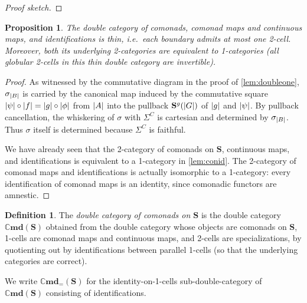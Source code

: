 \documentclass[11pt, oneside, article]{memoir}
\theoremstyle{plain}
\newtheorem{proposition}[theorem]{Proposition}
\theoremstyle{definition}
\newtheorem{definition}[def]{Definition}
\theoremstyle{remark}
\DeclarePairedDelimiter{\abs}{\lvert}{\rvert}
\newcommand{\namedcat}[1]{\mathbf{#1}}
\newcommand{\cat}[1]{\mathbf{#1}}
\newcommand{\Cmd}{\mathbb{C}\namedcat{md}}
\newcommand{\CmdId}{\Cmd_=}
\newcommand{\pts}[1]{{\abs{#1}}}
\newcommand{\qpts}[1]{\pts{#1}}
\newcommand{\one}[1]{\pts{#1}}
\newcommand{\carr}{\Sigma}
\newcommand{\car}[1]{\carr^{#1}}
\newcommand{\carC}{\car{\cC}}
\newcommand{\con}[2]{{#1}^{#2}}
\newcommand{\connat}[1]{\vec{#1}}
\newcommand{\cmnd}[1]{{#1}}
\newcommand{\cA}{\cmnd{A}}
\newcommand{\cB}{\cmnd{B}}
\newcommand{\cC}{\cmnd{C}}
\newcommand{\cD}{\cmnd{D}}
\newcommand{\bS}{\cat{S}}
\begin{document}
\begin{proof}[Proof sketch]
\end{proof}

\begin{proposition}\label{lem:thin}
  The double category of comonads, comonad maps and continuous maps,
  and identifications is thin, i.e.\ each boundary admits at most one
  2-cell. Moreover, both its underlying 2-categories are equivalent to
  1-categories (all globular 2-cells in this thin double category are
  invertible).
\end{proposition}
\begin{proof}
  As witnessed by the commutative diagram in the proof of
  \cref{lem:doubleone}, $\sigma_{\qpts{\cB}}$ is carried by the
  canonical map induced by the commutative square
  $\one{\psi} \circ \one{f} = \one{g} \circ \one{\phi}$ from
  $\qpts{A}$ into the pullback $\con{\bS}{g}(\qpts{G})$ of $\one{g}$
  and $\one{\psi}$. By pullback cancellation, the whiskering of
  $\sigma$ with $\carC$ is cartesian and determined by
  $\sigma_{\qpts{\cB}}$. Thus $\sigma$ itself is determined because
  $\carC$ is faithful.
  
  We have already seen that the 2-category of comonads on $\bS$,
  continuous maps, and identifications is equivalent to a
  1-category in \cref{lem:conid}. The 2-category of comonad maps and
  identifications is actually isomorphic to a 1-category: every
  identification of comonad maps is an identity, since comonadic
  functors are amnestic.
\end{proof}

\begin{definition}
  The \emph{double category of comonads on $\bS$} is the double
  category $\Cmd(\bS)$ obtained from the double category whose objects
  are comonads on $\bS$, 1-cells are comonad maps and continuous maps,
  and 2-cells are specializations, by quotienting out by
  identifications between parallel 1-cells (so that the underlying
  categories are correct).

  We write $\CmdId(\bS)$ for the identity-on-1-cells
  sub-double-category of $\Cmd(\bS)$ consisting of identifications.
\end{definition}
\end{document}
